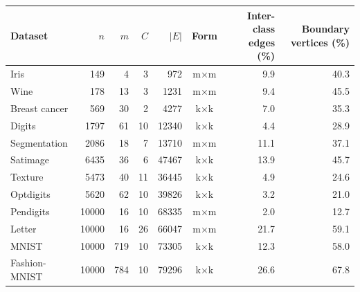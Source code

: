 \begin{tabular}{@{}lrrrrcrr@{}}
\toprule
Dataset & $n$ & $m$ & $C$ & $|E|$ & Form & Inter-class edges (\%) & Boundary vertices (\%) \\
\midrule
Iris & 149 & 4 & 3 & 972 & m$\times$m & 9.9 & 40.3 \\
Wine & 178 & 13 & 3 & 1231 & m$\times$m & 9.4 & 45.5 \\
Breast cancer & 569 & 30 & 2 & 4277 & k$\times$k & 7.0 & 35.3 \\
Digits & 1797 & 61 & 10 & 12340 & k$\times$k & 4.4 & 28.9 \\
Segmentation & 2086 & 18 & 7 & 13710 & m$\times$m & 11.1 & 37.1 \\
Satimage & 6435 & 36 & 6 & 47467 & k$\times$k & 13.9 & 45.7 \\
Texture & 5473 & 40 & 11 & 36445 & k$\times$k & 4.9 & 24.6 \\
Optdigits & 5620 & 62 & 10 & 39826 & k$\times$k & 3.2 & 21.0 \\
Pendigits & 10000 & 16 & 10 & 68335 & m$\times$m & 2.0 & 12.7 \\
Letter & 10000 & 16 & 26 & 66047 & m$\times$m & 21.7 & 59.1 \\
MNIST & 10000 & 719 & 10 & 73305 & k$\times$k & 12.3 & 58.0 \\
Fashion-MNIST & 10000 & 784 & 10 & 79296 & k$\times$k & 26.6 & 67.8 \\
\bottomrule
\end{tabular}

